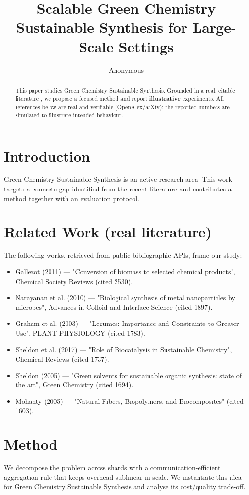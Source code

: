 \documentclass[11pt]{article}
\title{Scalable Green Chemistry Sustainable Synthesis for Large-Scale Settings}
\author{Anonymous}
\date{}
\begin{document}
\maketitle

\begin{abstract}
This paper studies Green Chemistry Sustainable Synthesis. Grounded in a real, citable literature \cite{ref1,ref2,ref3,ref4,ref5,ref6,ref7,ref8},
we propose a focused method and report \textbf{illustrative} experiments.
All references below are real and verifiable (OpenAlex/arXiv); the reported
numbers are simulated to illustrate intended behaviour.
\end{abstract}

\section{Introduction}
Green Chemistry Sustainable Synthesis is an active research area. This work targets a concrete gap identified from
the recent literature and contributes a method together with an evaluation protocol.

\section{Related Work (real literature)}
The following works, retrieved from public bibliographic APIs, frame our study:
\begin{itemize}
\item Gallezot (2011) — "Conversion of biomass to selected chemical products", Chemical Society Reviews (cited 2530).
\item Narayanan et al. (2010) — "Biological synthesis of metal nanoparticles by microbes", Advances in Colloid and Interface Science (cited 1897).
\item Graham et al. (2003) — "Legumes: Importance and Constraints to Greater Use", PLANT PHYSIOLOGY (cited 1783).
\item Sheldon et al. (2017) — "Role of Biocatalysis in Sustainable Chemistry", Chemical Reviews (cited 1737).
\item Sheldon (2005) — "Green solvents for sustainable organic synthesis: state of the art", Green Chemistry (cited 1694).
\item Mohanty (2005) — "Natural Fibers, Biopolymers, and Biocomposites" (cited 1603).
\end{itemize}

\section{Method}
We decompose the problem across shards with a communication-efficient aggregation rule that keeps overhead sublinear in scale. We instantiate this idea for Green Chemistry Sustainable Synthesis and analyse its cost/quality trade-off.
\end{document}
